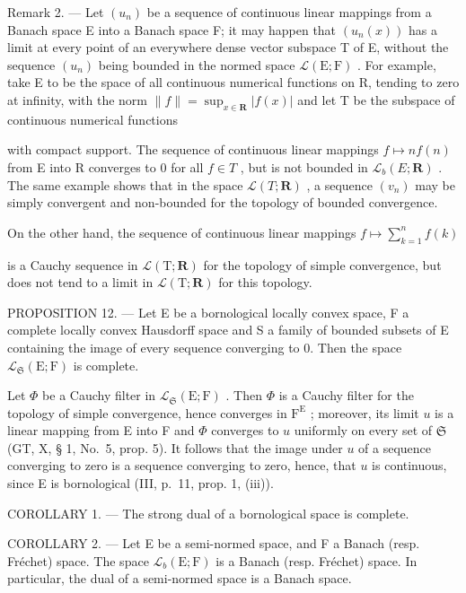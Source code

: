 Remark 2. --- Let \((u_{n})\) be a sequence of continuous linear mappings from a Banach space E into a Banach space F; it may happen that \((u_{n}(x))\) has a limit at every point of an everywhere dense vector subspace T of E, without the sequence \((u_{n})\) being bounded in the normed space \(\mathcal{L}(\mathrm{E};\mathrm{F})\) . For example, take E to be the space of all continuous numerical functions on R, tending to zero at infinity, with the norm \(\|f\| = \sup_{x \in \mathbf{R}} |f(x)|\) and let T be the subspace of continuous numerical functions

with compact support. The sequence of continuous linear mappings \(f \mapsto nf(n)\) from E into R converges to 0 for all \(f \in T\) , but is not bounded in \(\mathcal{L}_{b}(E; \mathbf{R})\) . The same example shows that in the space \(\mathcal{L}(T; \mathbf{R})\) , a sequence \((v_{n})\) may be simply convergent and non-bounded for the topology of bounded convergence.

On the other hand, the sequence of continuous linear mappings \(f \mapsto \sum_{k=1}^{n} f(k)\)

is a Cauchy sequence in \(\mathcal{L}(\mathrm{T};\mathbf{R})\) for the topology of simple convergence, but does not tend to a limit in \(\mathcal{L}(\mathrm{T};\mathbf{R})\) for this topology.

PROPOSITION 12. --- Let E be a bornological locally convex space, F a complete locally convex Hausdorff space and S a family of bounded subsets of E containing the image of every sequence converging to 0. Then the space \(\mathcal{L}_{\mathfrak{S}}(\mathrm{E};\mathrm{F})\) is complete.

Let \(\Phi\) be a Cauchy filter in \(\mathcal{L}_{\mathfrak{S}}(\mathrm{E};\mathrm{F})\) . Then \(\Phi\) is a Cauchy filter for the topology of simple convergence, hence converges in \(\mathrm{F}^{\mathrm{E}}\) ; moreover, its limit \(u\) is a linear mapping from E into F and \(\Phi\) converges to \(u\) uniformly on every set of \(\mathfrak{S}\) (GT, X, § 1, No.~5, prop. 5). It follows that the image under \(u\) of a sequence converging to zero is a sequence converging to zero, hence, that \(u\) is continuous, since E is bornological (III, p.~11, prop. 1, (iii)).

COROLLARY 1. --- The strong dual of a bornological space is complete.

COROLLARY 2. --- Let E be a semi-normed space, and F a Banach (resp. Fréchet) space. The space \(\mathcal{L}_{b}(\mathrm{E};\mathrm{F})\) is a Banach (resp. Fréchet) space. In particular, the dual of a semi-normed space is a Banach space.

